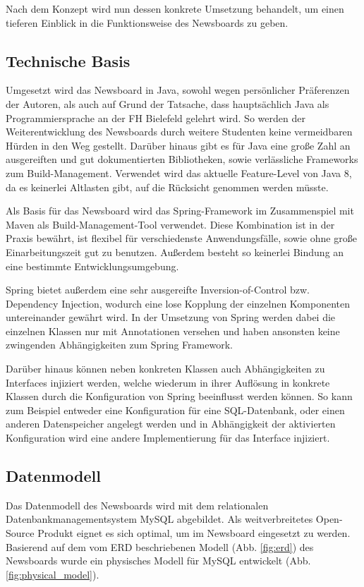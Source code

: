 Nach dem Konzept wird nun dessen konkrete Umsetzung behandelt,
um einen tieferen Einblick in die Funktionsweise des Newsboards zu geben.

\subsection{Technische Basis}
Umgesetzt wird das Newsboard in Java, sowohl wegen persönlicher Präferenzen der Autoren,
als auch auf Grund der Tatsache, dass hauptsächlich Java als Programmiersprache
an der FH Bielefeld gelehrt wird. So werden der Weiterentwicklung des Newsboards
durch weitere Studenten keine vermeidbaren Hürden in den Weg gestellt.
Darüber hinaus gibt es für Java eine große Zahl an ausgereiften
und gut dokumentierten Bibliotheken, sowie verlässliche Frameworks zum 
Build-Management. Verwendet wird das aktuelle Feature-Level von Java 8,
da es keinerlei Altlasten gibt, auf die Rücksicht genommen werden müsste.

Als Basis für das Newsboard wird das Spring-Framework im Zusammenspiel mit Maven
als Build-Management-Tool verwendet. Diese Kombination ist in der Praxis bewährt,
ist flexibel für verschiedenste Anwendungsfälle, sowie ohne große Einarbeitungszeit
gut zu benutzen. Außerdem besteht so keinerlei Bindung
an eine bestimmte Entwicklungsumgebung.

Spring bietet außerdem eine sehr ausgereifte Inversion-of-Control bzw.
Dependency Injection, wodurch eine lose Kopplung der einzelnen Komponenten
untereinander gewährt wird\cite{fowler-ioc}.
In der Umsetzung von Spring werden dabei die einzelnen Klassen nur mit
Annotationen versehen und haben ansonsten keine zwingenden Abhängigkeiten
zum Spring Framework.

Darüber hinaus können neben konkreten Klassen auch Abhängigkeiten zu Interfaces
injiziert werden, welche wiederum in ihrer Auflösung in konkrete Klassen
durch die Konfiguration von Spring beeinflusst werden können.
So kann zum Beispiel entweder eine Konfiguration für eine SQL-Datenbank,
oder einen anderen Datenspeicher angelegt werden und in Abhängigkeit
der aktivierten Konfiguration wird eine andere Implementierung für das
Interface injiziert.

\subsection{Datenmodell}
Das Datenmodell des Newsboards wird mit dem relationalen Datenbankmanagementsystem MySQL
abgebildet. Als weitverbreitetes Open-Source Produkt eignet es sich optimal, um im
Newsboard eingesetzt zu werden. Basierend auf dem vom ERD beschriebenen Modell
(Abb. \ref{fig:erd}) des Newsboards wurde ein physisches Modell für MySQL entwickelt
(Abb. \ref{fig:physical_model}).

